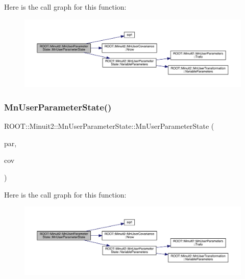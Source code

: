 Here is the call graph for this function\+:\nopagebreak
\begin{figure}[H]
\begin{center}
\leavevmode
\includegraphics[width=350pt]{d3/de0/classROOT_1_1Minuit2_1_1MnUserParameterState_a146a0e2f845431830d795b919bb8f594_cgraph}
\end{center}
\end{figure}
\mbox{\label{classROOT_1_1Minuit2_1_1MnUserParameterState_adc49551ffd44db2eb6e2decfdafb2625}} 
\subsubsection{\texorpdfstring{MnUserParameterState()}{MnUserParameterState()}\hspace{0.1cm}{\footnotesize\ttfamily [5/16]}}
{\footnotesize\ttfamily R\+O\+O\+T\+::\+Minuit2\+::\+Mn\+User\+Parameter\+State\+::\+Mn\+User\+Parameter\+State (\begin{DoxyParamCaption}\item[{const std\+::vector$<$ double $>$ \&}]{par,  }\item[{const \mbox{\hyperlink{classROOT_1_1Minuit2_1_1MnUserCovariance}{Mn\+User\+Covariance}} \&}]{cov }\end{DoxyParamCaption})}

Here is the call graph for this function\+:\nopagebreak
\begin{figure}[H]
\begin{center}
\leavevmode
\includegraphics[width=350pt]{d3/de0/classROOT_1_1Minuit2_1_1MnUserParameterState_adc49551ffd44db2eb6e2decfdafb2625_cgraph}
\end{center}
\end{figure}
\mbox{\label{classROOT_1_1Minuit2_1_1MnUserParameterState_aafeef85943691c9736a58d6a7830259a}} 
